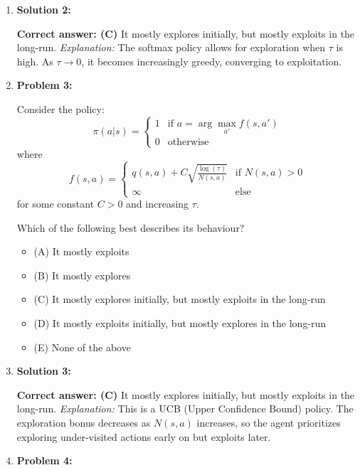\begin{example}
\begin{enumerate}
        \item \textbf{Solution 2:}
    
        \textbf{Correct answer: (C)} It mostly explores initially, but mostly exploits in the long-run.  
        \textit{Explanation:} The softmax policy allows for exploration when $\tau$ is high. As $\tau \rightarrow 0$, it becomes increasingly greedy, converging to exploitation.
    
        \item \textbf{Problem 3:}
    
        Consider the policy:
        \[
        \pi(a|s) = 
        \begin{cases}
        1 & \text{if } a = \arg\max_{a'} f(s, a') \\
        0 & \text{otherwise}
        \end{cases}
        \]
        where
        \[
        f(s,a) = 
        \begin{cases}
        q(s,a) + C \sqrt{\frac{\log(\tau)}{N(s,a)}} & \text{if } N(s,a) > 0 \\
        \infty & \text{else}
        \end{cases}
        \]
        for some constant $C > 0$ and increasing $\tau$.
    
        Which of the following best describes its behaviour?
        \begin{itemize}
            \item (A) It mostly exploits
            \item (B) It mostly explores
            \item (C) It mostly explores initially, but mostly exploits in the long-run
            \item (D) It mostly exploits initially, but mostly explores in the long-run
            \item (E) None of the above
        \end{itemize}
    
        \item \textbf{Solution 3:}
    
        \textbf{Correct answer: (C)} It mostly explores initially, but mostly exploits in the long-run.  
        \textit{Explanation:} This is a UCB (Upper Confidence Bound) policy. The exploration bonus decreases as $N(s,a)$ increases, so the agent prioritizes exploring under-visited actions early on but exploits later.
    
        \item \textbf{Problem 4:}
    

\end{enumerate}
\end{example}
